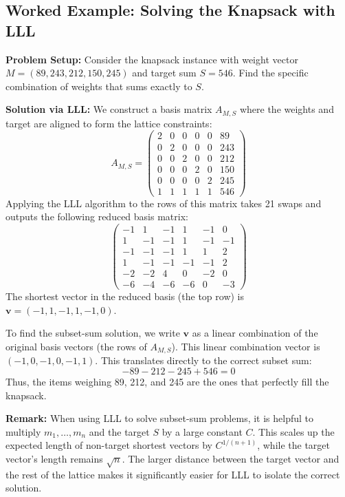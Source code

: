 \documentclass[12pt, a4paper]{article}
\theoremstyle{definition}
\theoremstyle{plain}
\begin{document}
\subsection{Worked Example: Solving the Knapsack with LLL}

\textbf{Problem Setup:} Consider the knapsack instance with weight vector $M = (89, 243, 212, 150, 245)$ and target sum $S = 546$. Find the specific combination of weights that sums exactly to $S$.

\textbf{Solution via LLL:}
We construct a basis matrix $A_{M,S}$ where the weights and target are aligned to form the lattice constraints:
\[
    A_{M,S} = 
    \begin{pmatrix}
    2 & 0 & 0 & 0 & 0 & 89 \\
    0 & 2 & 0 & 0 & 0 & 243 \\
    0 & 0 & 2 & 0 & 0 & 212 \\
    0 & 0 & 0 & 2 & 0 & 150 \\
    0 & 0 & 0 & 0 & 2 & 245 \\
    1 & 1 & 1 & 1 & 1 & 546
    \end{pmatrix}
\]
Applying the LLL algorithm to the rows of this matrix takes 21 swaps and outputs the following reduced basis matrix:
\[
    \begin{pmatrix}
    -1 & 1 & -1 & 1 & -1 & 0 \\
    1 & -1 & -1 & 1 & -1 & -1 \\
    -1 & -1 & -1 & 1 & 1 & 2 \\
    1 & -1 & -1 & -1 & -1 & 2 \\
    -2 & -2 & 4 & 0 & -2 & 0 \\
    -6 & -4 & -6 & -6 & 0 & -3
    \end{pmatrix}
\]
The shortest vector in the reduced basis (the top row) is $\mathbf{v} = (-1, 1, -1, 1, -1, 0)$. 

To find the subset-sum solution, we write $\mathbf{v}$ as a linear combination of the original basis vectors (the rows of $A_{M,S}$). This linear combination vector is $(-1, 0, -1, 0, -1, 1)$. This translates directly to the correct subset sum:
\[
    -89 - 212 - 245 + 546 = 0
\]
Thus, the items weighing 89, 212, and 245 are the ones that perfectly fill the knapsack.

\textbf{Remark:} When using LLL to solve subset-sum problems, it is helpful to multiply $m_1, \dots, m_n$ and the target $S$ by a large constant $C$. This scales up the expected length of non-target shortest vectors by $C^{1/(n+1)}$, while the target vector's length remains $\sqrt{n}$. The larger distance between the target vector and the rest of the lattice makes it significantly easier for LLL to isolate the correct solution.
\end{document}
